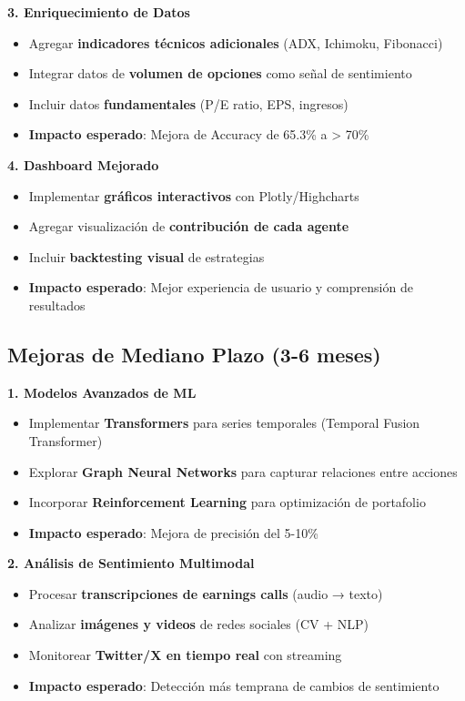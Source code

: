 \documentclass[12pt,a4paper]{report}
\begin{document}
\textbf{3. Enriquecimiento de Datos}
\begin{itemize}
    \item Agregar \textbf{indicadores técnicos adicionales} (ADX, Ichimoku, Fibonacci)
    \item Integrar datos de \textbf{volumen de opciones} como señal de sentimiento
    \item Incluir datos \textbf{fundamentales} (P/E ratio, EPS, ingresos)
    \item \textbf{Impacto esperado}: Mejora de Accuracy de 65.3\% a > 70\%
\end{itemize}

\textbf{4. Dashboard Mejorado}
\begin{itemize}
    \item Implementar \textbf{gráficos interactivos} con Plotly/Highcharts
    \item Agregar visualización de \textbf{contribución de cada agente}
    \item Incluir \textbf{backtesting visual} de estrategias
    \item \textbf{Impacto esperado}: Mejor experiencia de usuario y comprensión de resultados
\end{itemize}

\subsection{Mejoras de Mediano Plazo (3-6 meses)}

\textbf{1. Modelos Avanzados de ML}
\begin{itemize}
    \item Implementar \textbf{Transformers} para series temporales (Temporal Fusion Transformer)
    \item Explorar \textbf{Graph Neural Networks} para capturar relaciones entre acciones
    \item Incorporar \textbf{Reinforcement Learning} para optimización de portafolio
    \item \textbf{Impacto esperado}: Mejora de precisión del 5-10\%
\end{itemize}

\textbf{2. Análisis de Sentimiento Multimodal}
\begin{itemize}
    \item Procesar \textbf{transcripciones de earnings calls} (audio → texto)
    \item Analizar \textbf{imágenes y videos} de redes sociales (CV + NLP)
    \item Monitorear \textbf{Twitter/X en tiempo real} con streaming
    \item \textbf{Impacto esperado}: Detección más temprana de cambios de sentimiento
\end{itemize}
\end{document}
